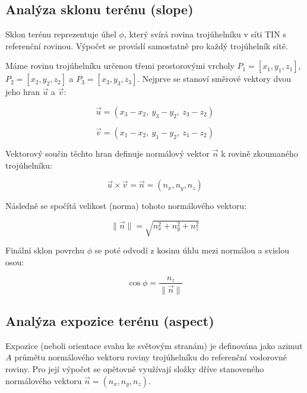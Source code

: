 \documentclass[9pt, a4paper]{article}
\begin{document}
\newpage
\subsection*{Analýza sklonu terénu (slope)}
\vspace{0.3 cm}
Sklon terénu reprezentuje úhel $\phi$, který svírá rovina trojúhelníku v síti TIN s referenční rovinou. Výpočet se provádí samostatně pro každý trojúhelník sítě.

\vspace{0.3 cm}
\noindent Máme rovinu trojúhelníku určenou třemi prostorovými vrcholy $P_1=[x_1,y_1,z_1]$, $P_2=[x_2,y_2,z_2]$ a $P_3=[x_3,y_3,z_3]$. Nejprve se stanoví směrové vektory dvou jeho hran $\vec{u}$ a $\vec{v}$:

\vspace{0.3 cm}
$$\vec{u}=(x_3-x_2, \ y_3-y_2, \ z_3-z_2)$$

\vspace{0.3 cm}
$$\vec{v}=(x_1-x_2, \ y_1-y_2, \ z_1-z_2)$$

\vspace{0.3 cm}
\noindent Vektorový součin těchto hran definuje normálový vektor $\vec{n}$ k rovině zkoumaného trojúhelníku:

\vspace{0.3 cm}
$$\vec{u} \times \vec{v} = \vec{n} = (n_x, n_y, n_z)$$

\vspace{0.3 cm}
\noindent Následně se spočítá velikost (norma) tohoto normálového vektoru:

\vspace{0.3 cm}
$$\|\vec{n}\| = \sqrt{n_x^2 + n_y^2 + n_z^2}$$

\vspace{0.3 cm}
\noindent Finální sklon povrchu $\phi$ se poté odvodí z kosinu úhlu mezi normálou a svislou osou:

\vspace{0.3 cm}
$$\cos \phi = \frac{n_z}{\|\vec{n}\|}$$

\subsection{Analýza expozice terénu (aspect)}
\vspace{0.3 cm}
Expozice (neboli orientace svahu ke světovým stranám) je definována jako azimut $A$ průmětu normálového vektoru roviny trojúhelníku do referenční vodorovné roviny. Pro její výpočet se opětovně využívají složky dříve stanoveného normálového vektoru $\vec{n} = (n_x, n_y, n_z)$.
\end{document}

